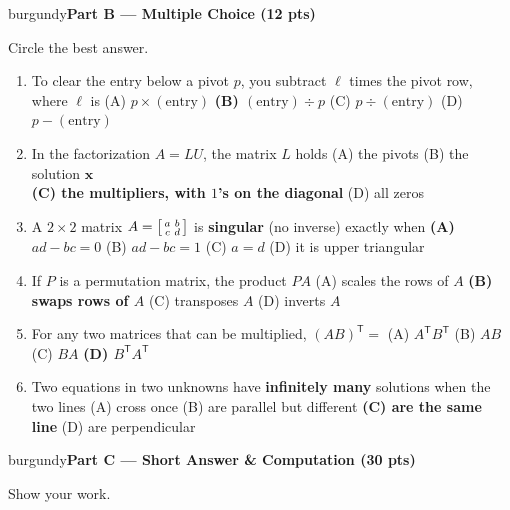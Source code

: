 \documentclass[10pt]{article}
\newcommand{\xx}{\mathbf{x}}
\newcommand{\parthead}[1]{%
  \vspace{6pt}\noindent
  \begin{headlinebox}{burgundy}{\color{white}\bfseries #1}\end{headlinebox}%
  \vspace{4pt}}
\begin{document}
\parthead{Part B --- Multiple Choice (12 pts)}
Circle the best answer.

\begin{enumerate}[leftmargin=1.9em, itemsep=9pt]
  \item To clear the entry below a pivot $p$, you subtract $\ell$ times the pivot row, where $\ell$ is
    \hfill (A) $p\times(\text{entry})$ \quad \textbf{(B) $(\text{entry})\div p$} \ans{$\leftarrow$} \quad
    (C) $p\div(\text{entry})$ \quad (D) $p-(\text{entry})$
  \item In the factorization $A=LU$, the matrix $L$ holds
    \hfill (A) the pivots \quad (B) the solution $\xx$ \\
    \phantom{x}\hfill \textbf{(C) the multipliers, with $1$'s on the diagonal} \ans{$\leftarrow$} \quad (D) all zeros
  \item A $2\times2$ matrix $A=\begin{bsmallmatrix}a&b\\c&d\end{bsmallmatrix}$ is \textbf{singular} (no inverse) exactly when
    \hfill \textbf{(A) $ad-bc=0$} \ans{$\leftarrow$} \quad (B) $ad-bc=1$ \quad (C) $a=d$ \quad (D) it is upper triangular
  \item If $P$ is a permutation matrix, the product $PA$
    \hfill (A) scales the rows of $A$ \quad \textbf{(B) swaps rows of $A$} \ans{$\leftarrow$} \quad (C) transposes $A$ \quad (D) inverts $A$
  \item For any two matrices that can be multiplied, $(AB)^{\mathsf T}=$
    \hfill (A) $A^{\mathsf T}B^{\mathsf T}$ \quad (B) $AB$ \quad (C) $BA$ \quad \textbf{(D) $B^{\mathsf T}A^{\mathsf T}$} \ans{$\leftarrow$}
  \item Two equations in two unknowns have \textbf{infinitely many} solutions when the two lines
    \hfill (A) cross once \quad (B) are parallel but different \quad \textbf{(C) are the same line} \ans{$\leftarrow$} \quad (D) are perpendicular
\end{enumerate}

\parthead{Part C --- Short Answer \& Computation (30 pts)}
Show your work.
\end{document}
